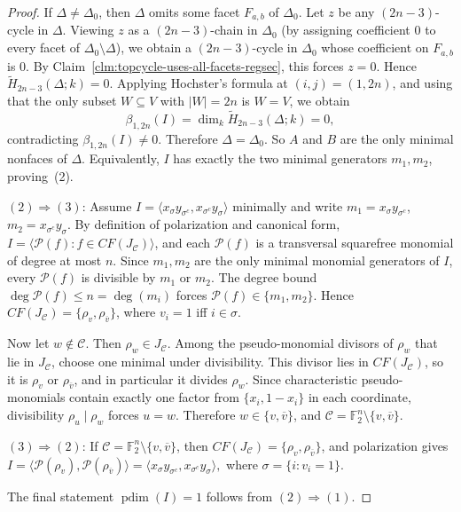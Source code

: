\documentclass[12pt]{amsart}
\theoremstyle{remark}
\theoremstyle{definition}
\DeclareMathOperator{\pd}{pdim}
\newcommand{\F}{\mathbb{F}}
\newcommand{\C}{\mathcal{C}}
\def\P{{\mathcal P}}
\begin{document}
\begin{proof}
If \(\Delta\neq\Delta_0\), then \(\Delta\) omits some facet \(F_{a,b}\) of \(\Delta_0\).
Let \(z\) be any \((2n-3)\)-cycle in \(\Delta\). Viewing \(z\) as a \((2n-3)\)-chain in \(\Delta_0\)
(by assigning coefficient \(0\) to every facet of \(\Delta_0\setminus\Delta\)), we obtain a
\((2n-3)\)-cycle in \(\Delta_0\) whose coefficient on \(F_{a,b}\) is \(0\). By
Claim~\ref{clm:topcycle-uses-all-facets-regsec}, this forces \(z=0\). Hence
\(\widetilde H_{2n-3}(\Delta;k)=0\).
Applying Hochster's formula at \((i,j)=(1,2n)\),
and using that the only subset \(W\subseteq V\) with \(|W|=2n\) is \(W=V\), we obtain
\[
\beta_{1,2n}(I)=\dim_k \widetilde H_{2n-3}(\Delta;k)=0,
\]
contradicting \(\beta_{1,2n}(I)\neq 0\). Therefore \(\Delta=\Delta_0\). So \(A\) and \(B\) are the only minimal
nonfaces of \(\Delta\). Equivalently, \(I\) has exactly the two minimal generators \(m_1,m_2\), proving~(2).



\((2)\Rightarrow(3)\):
Assume \(I=\langle x_\sigma y_{\sigma^c}, x_{\sigma^c}y_\sigma\rangle\) minimally and write
\(m_1=x_\sigma y_{\sigma^c}\), \(m_2=x_{\sigma^c}y_\sigma\).
By definition of polarization and canonical form, \(I=\langle \P(f): f\in CF(J_\C)\rangle\), and each
\(\P(f)\) is a transversal squarefree monomial of degree at most \( n\).
Since \(m_1,m_2\) are the only minimal monomial generators of \(I\), every \(\P(f)\) is divisible by \(m_1\)
or \(m_2\). The degree bound \(\deg \P(f)\le n=\deg(m_i)\) forces \(\P(f)\in\{m_1,m_2\}\).
Hence \(CF(J_\C)=\{\rho_v,\rho_{\overline v}\}\), where \(v_i=1\) iff \(i\in\sigma\).

Now let \(w\notin\C\). Then \(\rho_w\in J_\C\). Among the pseudo-monomial divisors of \(\rho_w\) that lie in \(J_\C\),
choose one minimal under divisibility. This divisor lies in \(CF(J_\C)\), so it is \(\rho_v\) or \(\rho_{\overline v}\),
and in particular it divides \(\rho_w\). Since characteristic pseudo-monomials contain exactly one factor from
\(\{x_i,1-x_i\}\) in each coordinate, divisibility \(\rho_u\mid \rho_w\) forces \(u=w\). Therefore
\(w\in\{v,\overline v\}\), and \(\C=\F_2^n\setminus\{v,\overline v\}\).


\((3)\Rightarrow(2)\):
If \(\C=\F_2^n\setminus\{v,\overline v\}\), then \(CF(J_\C)=\{\rho_v,\rho_{\overline v}\}\),
and polarization gives
\(
I=\langle \P(\rho_v),\P(\rho_{\overline v})\rangle
=\langle x_\sigma y_{\sigma^c}, x_{\sigma^c}y_\sigma\rangle,
\)
where \(\sigma=\{i:v_i=1\}\).



The final statement \(\pd(I)=1\) follows from \((2)\Rightarrow(1)\).
\end{proof}
\end{document}
